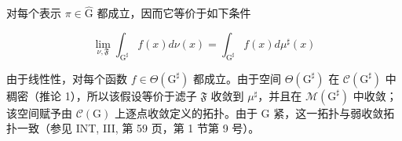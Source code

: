 对每个表示 \(\pi\in\widehat{\mathrm{G}}\) 都成立，因而它等价于如下条件

\[
\lim _ {\nu , \mathfrak {F}} \int_ {\mathrm{G} ^ {\sharp}} f (x) d \nu (x) = \int_ {\mathrm{G} ^ {\sharp}} f (x) d \mu^ {\sharp} (x)
\]

由于线性性，对每个函数 \(f \in \Theta(\mathrm{G}^{\sharp})\) 都成立。由于空间 \(\Theta(\mathrm{G}^{\sharp})\) 在 \(\mathcal{C}(\mathrm{G}^{\sharp})\) 中稠密（推论 1），所以该假设等价于滤子 \(\mathfrak{F}\) 收敛到 \(\mu^{\sharp}\)，并且在 \(\mathcal{M}(\mathrm{G}^{\sharp})\) 中收敛；该空间赋予由 \(\mathcal{C}(\mathrm{G})\) 上逐点收敛定义的拓扑。由于 G 紧，这一拓扑与弱收敛拓扑一致（参见 INT, III, 第 59 页，第 1 节第 9 号）。

